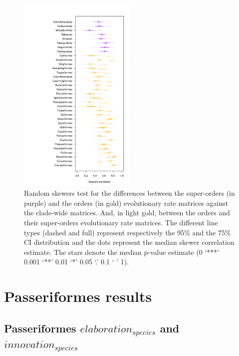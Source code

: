 \documentclass[12pt,a4paper]{article}
\begin{document}
\begin{figure}[H]
\centering
   \includegraphics[width=0.5\textwidth]{Figures/random_skewers.pdf}
\caption{Random skewers test for the differences between the super-orders (in purple) and the orders (in gold) evolutionary rate matrices against the clade-wide matrices. And, in light gold, between the orders and their super-orders evolutionary rate matrices. The different line types (dashed and full) represent respectively the 95\% and the 75\% CI distribution and the dots represent the median skewer correlation estimate. The stars denote the median p-value estimate (0 ‘***’ 0.001 ‘**’ 0.01 ‘*’ 0.05 ‘.’ 0.1 ‘ ’ 1).}
\label{/home/tguillerme/Projects/elaboration_exploration_bird_beaks/Manuscript/Figures/others/figure_phylo_spiro_dark.png
/home/tguillerme/Projects/elaboration_exploration_bird_beaks/Manuscript/Figures/others/orthogonality_results.png
/home/tguillerme/Projects/elaboration_exploration_bird_beaks/Manuscript/Figures/others/relative_EI_gg_style.png}
\end{figure}

%
%


\newpage
\clearpage
\section{Passeriformes results}

\subsection{Passeriformes $elaboration_{species}$ and $innovation_{species}$}
\end{document}
